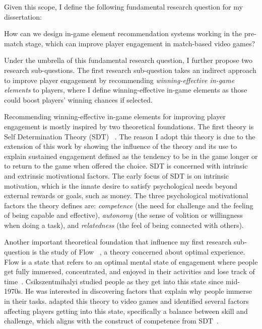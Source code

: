 Given this scope, I define the following fundamental research question for my dissertation:

\begin{displayquote}
How can we design in-game element recommendation systems working in the pre-match stage, which can improve player engagement in match-based video games?
\end{displayquote}


Under the umbrella of this fundamental research question, I further propose two research sub-questions. The first research sub-question takes an indirect approach to improve player engagement by recommending \textit{winning-effective in-game elements} to players, where I define winning-effective in-game elements as those could boost players' winning chances if selected. 

Recommending winning-effective in-game elements for improving player engagement is mostly inspired by two theoretical foundations. The first theory is Self Determination Theory (SDT) ~\citep{ryan2006motivational,przybylski2010motivational,yee2006motivations,wu2010falling,sherry2006video,lazzaro2004we,schoenau2011player}. The reason I adopt this theory is due to the extension of this work by \citep{przybylski2010motivational,ryan2006motivational} showing the influence of the theory and its use to explain sustained engagement defined as the tendency to be in the game longer or to return to the game when offered the choice. SDT is concerned with intrinsic and extrinsic motivational factors. The early focus of SDT is on intrinsic motivation, which is the innate desire to satisfy psychological needs beyond external rewards or goals, such as money. The three psychological motivational factors the theory defines are: \textit{competence} (the need for challenge and the feeling of being capable and effective), \textit{autonomy} (the sense of volition or willingness when doing a task), and \textit{relatedness} (the feel of being connected with others). 

Another important theoretical foundation that influence my first research sub-question is the study of Flow ~\citep{flow1990psychology}, a theory concerned about optimal experience. Flow is a state that refers to an optimal mental state of engagement where people get fully immersed, concentrated, and enjoyed in their activities and lose track of time~\citep{flow1990psychology}. Csikszentmihalyi studied people as they get into this state since mid-1970s. He was interested in discovering factors that explain why people immerse in their tasks. \textcite{sweetser2005gameflow} adapted this theory to video games and identified several factors affecting players getting into this state, specifically a balance between skill and challenge, which aligns with the construct of competence from SDT~\citep{ryan2000self}. 

